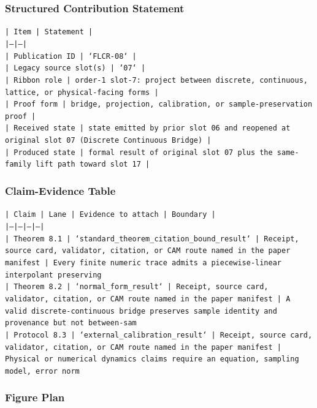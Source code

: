 \documentclass[11pt]{article}
\begin{document}
\subsubsection*{Structured Contribution Statement}

\noindent\texttt{| Item | Statement |}\\
\noindent\texttt{|---|---|}\\
\noindent\texttt{| Publication ID | `FLCR-08` |}\\
\noindent\texttt{| Legacy source slot(s) | `07` |}\\
\noindent\texttt{| Ribbon role | order-1 slot-7: project between discrete, continuous, lattice, or physical-facing forms |}\\
\noindent\texttt{| Proof form | bridge, projection, calibration, or sample-preservation proof |}\\
\noindent\texttt{| Received state | state emitted by prior slot 06 and reopened at original slot 07 (Discrete Continuous Bridge) |}\\
\noindent\texttt{| Produced state | formal result of original slot 07 plus the same-family lift path toward slot 17 |}\\

\subsubsection*{Claim-Evidence Table}

\noindent\texttt{| Claim | Lane | Evidence to attach | Boundary |}\\
\noindent\texttt{|---|---|---|---|}\\
\noindent\texttt{| Theorem 8.1 | `standard\_theorem\_citation\_bound\_result` | Receipt, source card, validator, citation, or CAM route named in the paper manifest | Every finite numeric trace admits a piecewise-linear interpolant preserving}\\
\noindent\texttt{| Theorem 8.2 | `normal\_form\_result` | Receipt, source card, validator, citation, or CAM route named in the paper manifest | A valid discrete-continuous bridge preserves sample identity and provenance but not between-sam}\\
\noindent\texttt{| Protocol 8.3 | `external\_calibration\_result` | Receipt, source card, validator, citation, or CAM route named in the paper manifest | Physical or numerical dynamics claims require an equation, sampling model, error norm}\\

\subsubsection*{Figure Plan}
\end{document}
